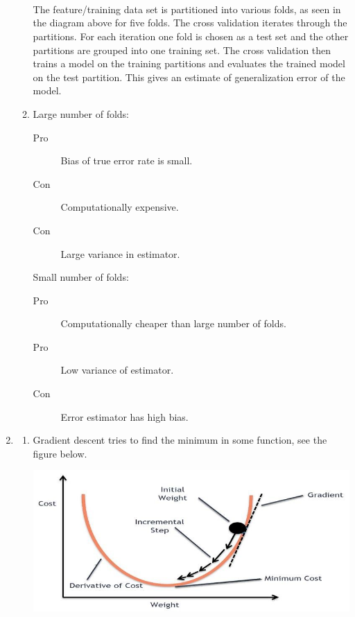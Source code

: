 \begin{enumerate}
\begin{enumerate}
\begin{minipage}[t]{0.9\textwidth}
\\
            $\phantom{a.}$\\
          \end{minipage}\\
          The feature/training data set is partitioned into various folds, as seen in the diagram above for five folds.
          The cross validation iterates through the partitions.
          For each iteration one fold is chosen as a test set and the other partitions are grouped into one training set.
          The cross validation then trains a model on the training partitions and evaluates the trained model on the test partition.
          This gives an estimate of generalization error of the model.
        \item
          Large number of folds:
          \begin{description}
              \item[Pro] Bias of true error rate is small.
              \item[Con] Computationally expensive.
              \item[Con] Large variance in estimator.
          \end{description}
          Small number of folds:
          \begin{description}
              \item[Pro] Computationally cheaper than large number of folds.
              \item[Pro] Low variance of estimator.
              \item[Con] Error estimator has high bias.
          \end{description}
      \end{enumerate}
    \item
      \begin{enumerate}
          \item
            Gradient descent tries to find the minimum in some function, see the figure below.\\
            \begin{minipage}[t]{0.95\textwidth}
              \begin{center}
                \includegraphics[scale = 0.75]{task2/gradDesc.jpg}


\end{center}
\end{minipage}
\end{enumerate}
\end{enumerate}
